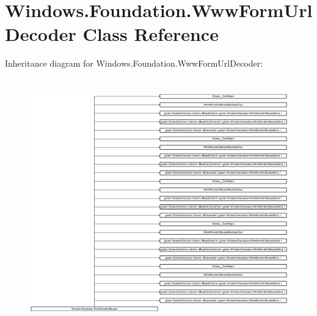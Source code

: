 \hypertarget{class_windows_1_1_foundation_1_1_www_form_url_decoder}{}\section{Windows.\+Foundation.\+Www\+Form\+Url\+Decoder Class Reference}
\label{class_windows_1_1_foundation_1_1_www_form_url_decoder}
Inheritance diagram for Windows.\+Foundation.\+Www\+Form\+Url\+Decoder\+:\begin{figure}[H]
\begin{center}
\leavevmode
\includegraphics[height=10.785185cm]{class_windows_1_1_foundation_1_1_www_form_url_decoder}
\end{center}
\end{figure}
